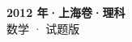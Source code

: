 \documentclass[zihao=-4, a4paper]{ctexart}
\begin{document}
\begin{center}
  {\Large\bfseries 2012 年·上海卷·理科}\\[4pt]
  {\large 数学 · 试题版}
\end{center}
\medskip
{}

\end{document}
